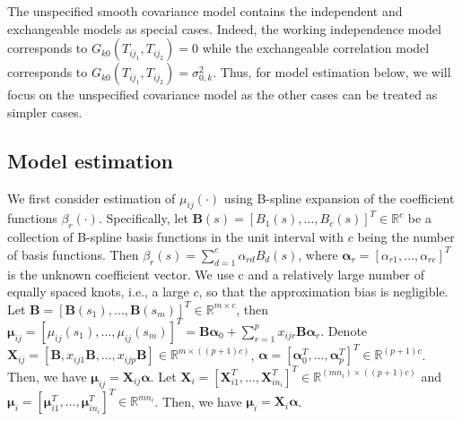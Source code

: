 \documentclass[submit]{smj}
\def\bB{\mathbf{B}}
\def\balpha{\boldsymbol{\alpha}}
\def\bmu{\boldsymbol{\mu}}
\def\bX{\mathbf{X}}
\def\bX{\mathbf{X}}
\def\bB{\mathbf{B}}
\def\balpha{\boldsymbol{\alpha}}
\def\bX{\mathbf{X}}
\begin{document}
The unspecified smooth covariance model contains the independent and exchangeable models as special cases. Indeed, the working independence model corresponds to $G_{k0}(T_{ij_1},T_{ij_2}) = 0$ while the exchangeable correlation model corresponds to  $G_{k0}(T_{ij_1},T_{ij_2}) = \sigma_{0, k}^2$. Thus, for model estimation below, we will focus on the unspecified covariance model as the other cases can be treated as simpler cases. 


\subsection{Model estimation} \label{sec:Modelestimation}
We first consider estimation of $\mu_{ij}(\cdot)$ using B-spline expansion of the coefficient functions $\beta_r(\cdot)$. Specifically, let $\bB(s) = [B_1(s),\ldots, B_c(s)]^{T}\in \mathbb{R}^c$ be a collection of B-spline basis functions in the unit interval with $c$ being the number of basis functions. Then $\beta_r(s) = \sum_{d=1}^c \alpha_{rd} B_{d}(s)$, where $\balpha_r = [\alpha_{r1},\ldots, \alpha_{rc}]^{T}$ is the unknown coefficient vector. 
We use c and a relatively large number of equally spaced knots, i.e., a large $c$, so that the approximation bias is negligible. Let $\bB =[\bB(s_1),\ldots, \bB(s_m)]^T\in \mathbb{R}^{m\times c}$, then
$\bmu_{ij} = [\mu_{ij}(s_1),\ldots, \mu_{ij}(s_m)]^T = \bB\balpha_0 + \sum_{r=1}^p x_{ijr}\bB\balpha_r$. Denote
$\bX_{ij} = [\bB, x_{ij1}\bB,\ldots, x_{ijp}\bB]\in \mathbb{R}^{m\times ((p+1)c)}$, 
$\balpha= [\balpha^T_0,\ldots,\balpha^T_p]^T\in\mathbb{R}^{(p+1)c}$. Then, we have
$\bmu_{ij} = \bX_{ij}\balpha$.
Let $\bX_i = [\bX^T_{i1},\ldots,\bX^T_{in_i}]^T\in \mathbb{R}^{(mn_i)\times ((p+1)c)}$
and $\bmu_i = [\bmu^T_{i1},\ldots, \bmu^T_{in_i}]^T\in \mathbb{R}^{mn_i}$. Then, we have $\bmu_i = \bX_i \balpha$. 
\end{document}
